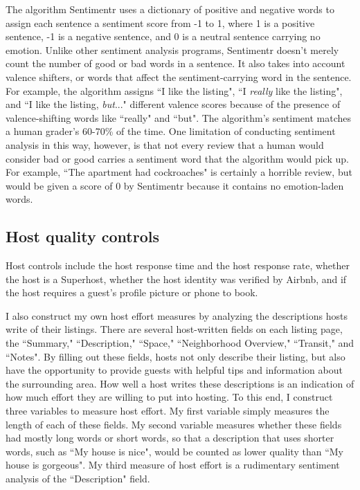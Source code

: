 The algorithm Sentimentr uses a dictionary of positive and negative words to assign each sentence a sentiment score from -1 to 1, where 1 is a positive sentence, -1 is a negative sentence, and 0 is a neutral sentence carrying no emotion. Unlike other sentiment analysis programs, Sentimentr doesn't merely count the number of good or bad words in a sentence. It also takes into account valence shifters, or words that affect the sentiment-carrying word in the sentence. For example, the algorithm assigns ``I like the listing", ``I \textit{really} like the listing", and ``I like the listing, \textit{but}..." different valence scores because of the presence of valence-shifting words like ``really" and ``but". The algorithm's sentiment matches a human grader's 60-70\% of the time. One limitation of conducting sentiment analysis in this way, however, is that not every review that a human would consider bad or good carries a sentiment word that the algorithm would pick up. For example, ``The apartment had cockroaches" is certainly a horrible review, but would be given a score of 0 by Sentimentr because it contains no emotion-laden words. 


\subsection*{Host quality controls}
Host controls include the host response time and the host response rate, whether the host is a Superhost, whether the host identity was verified by Airbnb, and if the host requires a guest's profile picture or phone to book. 

I also construct my own host effort measures by analyzing the descriptions hosts write of their listings. There are several host-written fields on each listing page, the ``Summary," ``Description," ``Space," ``Neighborhood Overview," ``Transit," and ``Notes". By filling out these fields, hosts not only describe their listing, but also have the opportunity to provide guests with helpful tips and information about the surrounding area. How well a host writes these descriptions is an indication of how much effort they are willing to put into hosting. To this end, I construct three variables to measure host effort. My first variable simply measures the length of each of these fields. My second variable measures whether these fields had mostly long words or short words, so that a description that uses shorter words, such as ``My house is nice", would be counted as lower quality than ``My house is gorgeous". My third measure of host effort is a rudimentary sentiment analysis of the ``Description" field.

